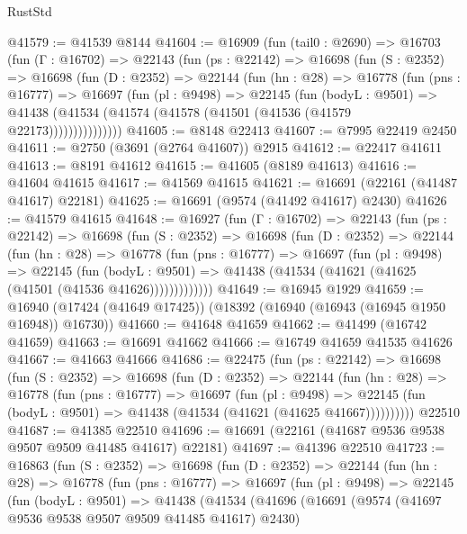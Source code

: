 \begin{lexlean}{RustStd}
\begin{coremodule}
@41579 := @41539 @8144
@41604 := @16909
    (fun (tail0 : @2690) =>
    @16703
      (fun (Γ : @16702) =>
      @22143
        (fun (ps : @22142) =>
        @16698
          (fun (S : @2352) =>
          @16698
            (fun (D : @2352) =>
            @22144
              (fun (hn : @28) =>
              @16778
                (fun (pns : @16777) =>
                @16697
                  (fun (pl : @9498) =>
                  @22145
                    (fun (bodyL : @9501) =>
                    @41438 (@41534 (@41574 (@41578 (@41501 (@41536 (@41579 @22173)))))))))))))))
@41605 := @8148 @22413
@41607 := @7995 @22419 @2450
@41611 := @2750 (@3691 (@2764 @41607)) @2915
@41612 := @22417 @41611
@41613 := @8191 @41612
@41615 := @41605 (@8189 @41613)
@41616 := @41604 @41615
@41617 := @41569 @41615
@41621 := @16691 (@22161 (@41487 @41617) @22181)
@41625 := @16691 (@9574 (@41492 @41617) @2430)
@41626 := @41579 @41615
@41648 := @16927
    (fun (Γ : @16702) =>
    @22143
      (fun (ps : @22142) =>
      @16698
        (fun (S : @2352) =>
        @16698
          (fun (D : @2352) =>
          @22144
            (fun (hn : @28) =>
            @16778
              (fun (pns : @16777) =>
              @16697
                (fun (pl : @9498) =>
                @22145
                  (fun (bodyL : @9501) =>
                  @41438 (@41534 (@41621 (@41625 (@41501 (@41536 @41626)))))))))))))
@41649 := @16945 @1929
@41659 := @16940 (@17424 (@41649 @17425)) (@18392 (@16940 (@16943 (@16945 @1950 @16948)) @16730))
@41660 := @41648 @41659
@41662 := @41499 (@16742 @41659)
@41663 := @16691 @41662
@41666 := @16749 @41659 @41535 @41626
@41667 := @41663 @41666
@41686 := @22475
    (fun (ps : @22142) =>
    @16698
      (fun (S : @2352) =>
      @16698
        (fun (D : @2352) =>
        @22144
          (fun (hn : @28) =>
          @16778
            (fun (pns : @16777) =>
            @16697
              (fun (pl : @9498) =>
              @22145 (fun (bodyL : @9501) => @41438 (@41534 (@41621 (@41625 @41667))))))))))
    @22510
@41687 := @41385 @22510
@41696 := @16691 (@22161 (@41687 @9536 @9538 @9507 @9509 @41485 @41617) @22181)
@41697 := @41396 @22510
@41723 := @16863
    (fun (S : @2352) =>
    @16698
      (fun (D : @2352) =>
      @22144
        (fun (hn : @28) =>
        @16778
          (fun (pns : @16777) =>
          @16697
            (fun (pl : @9498) =>
            @22145
              (fun (bodyL : @9501) =>
              @41438
                (@41534
                  (@41696
                    (@16691
                      (@9574 (@41697 @9536 @9538 @9507 @9509 @41485 @41617) @2430)

\end{coremodule}
\end{lexlean}
